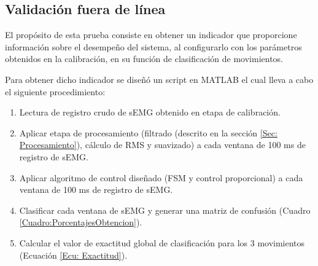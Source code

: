 \newpage
\subsection{Validación fuera de línea}
El propósito de esta prueba consiste en obtener un indicador que proporcione información sobre el desempeño del sistema, al configurarlo con los parámetros obtenidos en la calibración, en su función de clasificación de movimientos.


Para obtener dicho indicador se diseñó un script en MATLAB \textregistered \; el cual lleva a cabo el siguiente procedimiento:

\begin{enumerate}
	\item Lectura de registro crudo de sEMG obtenido en etapa de calibración.
	\item Aplicar etapa de procesamiento (filtrado (descrito en la sección \ref{Sec: Procesamiento}), cálculo de RMS y suavizado) a cada ventana de 100 ms de registro de sEMG.
	\item Aplicar algoritmo de control diseñado (FSM y control proporcional) a cada ventana de 100 ms de registro de sEMG.
	\item Clasificar cada ventana de sEMG y generar una matriz de confusión (Cuadro \ref{Cuadro:PorcentajesObtencion}).
	\item Calcular el valor de exactitud global de clasificación para los 3 movimientos (Ecuación \ref{Ecu: Exactitud}).
\end{enumerate}

